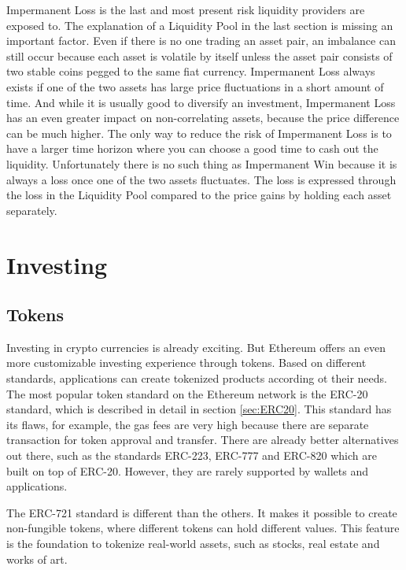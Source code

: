 Impermanent Loss is the last and most present risk liquidity providers are exposed to. The explanation of a Liquidity Pool in the last section is missing an important factor. Even if there is no one trading an asset pair, an imbalance can still occur because each asset is volatile by itself unless the asset pair consists of two stable coins pegged to the same fiat currency. Impermanent Loss always exists if one of the two assets has large price fluctuations in a short amount of time. And while it is usually good to diversify an investment, Impermanent Loss has an even greater impact on non-correlating assets, because the price difference can be much higher. The only way to reduce the risk of Impermanent Loss is to have a larger time horizon where you can choose a good time to cash out the liquidity. Unfortunately there is no such thing as Impermanent Win because it is always a loss once one of the two assets fluctuates. The loss is expressed through the loss in the Liquidity Pool compared to the price gains by holding each asset separately.

\section{Investing}
\subsection{Tokens}
Investing in crypto currencies is already exciting. But Ethereum offers an even more customizable investing experience through tokens. Based on different standards, applications can create tokenized products according ot their needs. The most popular token standard on the Ethereum network is the ERC-20 standard, which is described in detail in section \ref{sec:ERC20}. This standard has its flaws, for example, the gas fees are very high because there are separate transaction for token approval and transfer. There are already better alternatives out there, such as the standards ERC-223, ERC-777 and ERC-820 which are built on top of ERC-20. However, they are rarely supported by wallets and applications.

The ERC-721 standard is different than the others. It makes it possible to create non-fungible tokens, where different tokens can hold different values. This feature is the foundation to tokenize real-world assets, such as stocks, real estate and works of art.

